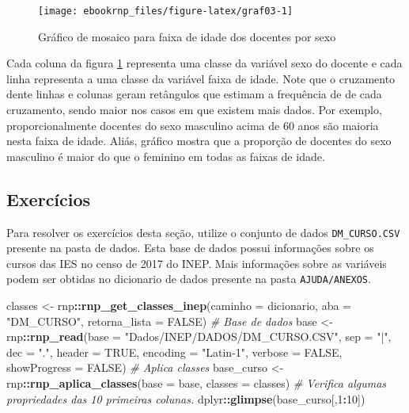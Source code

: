 \documentclass[12pt,]{style/krantz}
\makeatletter
\newenvironment{Shaded}{\begin{snugshade}}{\end{snugshade}}
\newcommand{\CommentTok}[1]{\textcolor[rgb]{0.56,0.35,0.01}{\textit{#1}}}
\newcommand{\DataTypeTok}[1]{\textcolor[rgb]{0.13,0.29,0.53}{#1}}
\newcommand{\DecValTok}[1]{\textcolor[rgb]{0.00,0.00,0.81}{#1}}
\newcommand{\KeywordTok}[1]{\textcolor[rgb]{0.13,0.29,0.53}{\textbf{#1}}}
\newcommand{\NormalTok}[1]{#1}
\newcommand{\OperatorTok}[1]{\textcolor[rgb]{0.81,0.36,0.00}{\textbf{#1}}}
\newcommand{\OtherTok}[1]{\textcolor[rgb]{0.56,0.35,0.01}{#1}}
\newcommand{\StringTok}[1]{\textcolor[rgb]{0.31,0.60,0.02}{#1}}
\newenvironment{kframe}{%
\medskip{}
\setlength{\fboxsep}{.8em}
 \def\at@end@of@kframe{}%
 \ifinner\ifhmode%
  \def\at@end@of@kframe{\end{minipage}}%
  \begin{minipage}{\columnwidth}%
 \fi\fi%
 \def\FrameCommand##1{\hskip\@totalleftmargin \hskip-\fboxsep
 \colorbox{shadecolor}{##1}\hskip-\fboxsep
     \hskip-\linewidth \hskip-\@totalleftmargin \hskip\columnwidth}%
 \MakeFramed {\advance\hsize-\width
   \@totalleftmargin\z@ \linewidth\hsize
   \@setminipage}}%
 {\par\unskip\endMakeFramed%
 \at@end@of@kframe}
\renewenvironment{Shaded}{\begin{kframe}}{\end{kframe}}
\theoremstyle{definition}
\theoremstyle{definition}
\theoremstyle{definition}
\theoremstyle{remark}
\makeatother
\begin{document}
\begin{figure}[H]

{\centering \texttt{[image: ebookrnp\_files/figure-latex/graf03-1]} 

}

\caption{Gráfico de mosaico para faixa de idade dos docentes por sexo}\label{fig:graf03}
\end{figure}

Cada coluna da figura \ref{fig:graf03} representa uma classe da variável sexo do docente e cada linha representa a uma classe da variável faixa de idade. Note que o cruzamento dente linhas e colunas geram retângulos que estimam a frequência de de cada cruzamento, sendo maior nos casos em que existem mais dados. Por exemplo, proporcionalmente docentes do sexo masculino acima de 60 anos são maioria nesta faixa de idade. Aliás, gráfico mostra que a proporção de docentes do sexo masculino é maior do que o feminino em todas as faixas de idade.

\hypertarget{exercicios}{%
\subsection{Exercícios}\label{exercicios}}

Para resolver os exercícios desta seção, utilize o conjunto de dados \texttt{DM\_CURSO.CSV} presente na pasta de dados. Esta base de dados possui informações sobre os cursos das IES no censo de 2017 do INEP. Mais informações sobre as variáveis podem ser obtidas no dicionario de dados presente na pasta \texttt{AJUDA/ANEXOS}.

\begin{Shaded}
\begin{Highlighting}[]
\NormalTok{classes <-}\StringTok{ }\NormalTok{rnp}\OperatorTok{::}\KeywordTok{rnp_get_classes_inep}\NormalTok{(}\DataTypeTok{caminho =}\NormalTok{ dicionario, }
                                     \DataTypeTok{aba =} \StringTok{"DM_CURSO"}\NormalTok{, }
                                     \DataTypeTok{retorna_lista =} \OtherTok{FALSE}\NormalTok{)}
\CommentTok{# Base de dados  }
\NormalTok{base <-}\StringTok{ }\NormalTok{rnp}\OperatorTok{::}\KeywordTok{rnp_read}\NormalTok{(}\DataTypeTok{base =} \StringTok{"Dados/INEP/DADOS/DM_CURSO.CSV"}\NormalTok{,}
                      \DataTypeTok{sep =} \StringTok{"|"}\NormalTok{, }
                      \DataTypeTok{dec =} \StringTok{"."}\NormalTok{, }
                      \DataTypeTok{header =} \OtherTok{TRUE}\NormalTok{, }
                      \DataTypeTok{encoding =} \StringTok{"Latin-1"}\NormalTok{,}
                      \DataTypeTok{verbose =} \OtherTok{FALSE}\NormalTok{, }
                      \DataTypeTok{showProgress =} \OtherTok{FALSE}\NormalTok{)}
\CommentTok{# Aplica classes}
\NormalTok{base_curso <-}\StringTok{ }\NormalTok{rnp}\OperatorTok{::}\KeywordTok{rnp_aplica_classes}\NormalTok{(}\DataTypeTok{base =}\NormalTok{ base, }\DataTypeTok{classes =}\NormalTok{ classes)}
\CommentTok{# Verifica algumas propriedades das 10 primeiras colunas.}
\NormalTok{dplyr}\OperatorTok{::}\KeywordTok{glimpse}\NormalTok{(base_curso[,}\DecValTok{1}\OperatorTok{:}\DecValTok{10}\NormalTok{])}
\end{Highlighting}
\end{Shaded}
\end{document}
